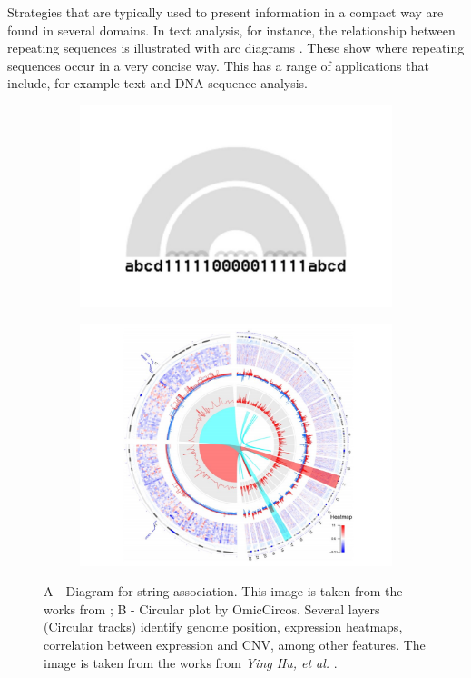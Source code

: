 Strategies that are typically used to present information in a compact way are found in several domains. In text analysis, for instance, the relationship between repeating sequences is illustrated with arc diagrams \cite{bitmap, arcplots}. These show where repeating sequences occur in a very concise way. This has a range of applications that include, for example text and DNA sequence analysis.

\begin{figure}[b]
    \centering
    \begin{subfigure}{0.5\linewidth}
    \centering
        \includegraphics[width=0.9\linewidth]{Figures/arcplots.pdf}
        \caption{}
        \label{fig:genomic}
    \end{subfigure}%
    \begin{subfigure}{0.5\linewidth}
        \centering
        \includegraphics[width=0.9\linewidth]{Figures/genomics.pdf}
        \caption{}
        \label{fig:genomic}
    \end{subfigure}
    \caption{A - Diagram for string association. This image is taken from the works from \cite{arcplots}; B - Circular plot by OmicCircos. Several layers (Circular tracks) identify genome position, expression heatmaps, correlation between expression and CNV, among other features. The image is taken from the works from \textit{Ying Hu, et al.} \cite{genomics}.}
\end{figure}

